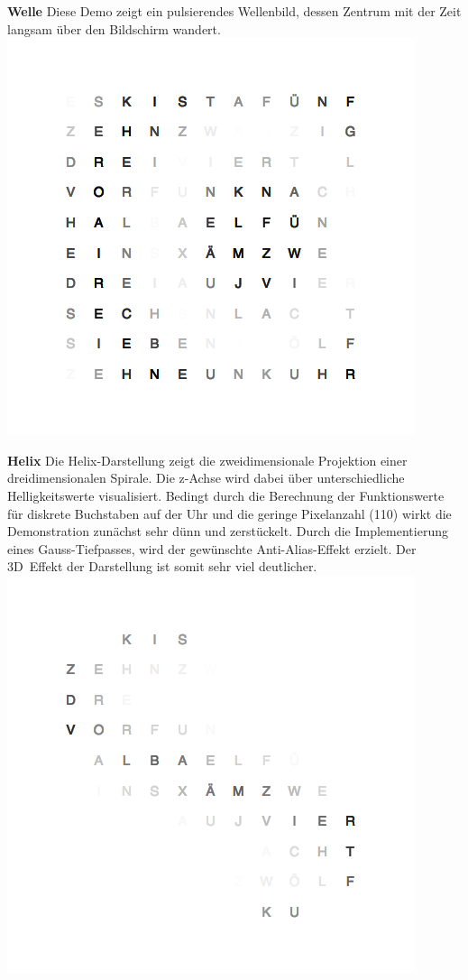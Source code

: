 \begin{multicols}{2}
\textbf{Welle}
Diese Demo zeigt ein pulsierendes Wellenbild, dessen Zentrum mit der Zeit langsam über den Bildschirm wandert.
\includegraphics[width=\columnwidth]{Abbildungen/Software/Demo/Welle}

\textbf{Helix}
Die Helix-Darstellung zeigt die zweidimensionale Projektion einer dreidimensionalen Spirale. Die z-Achse wird dabei über unterschiedliche Helligkeitswerte visualisiert. Bedingt durch die Berechnung der Funktionswerte für diskrete Buchstaben auf der Uhr und die geringe Pixelanzahl (110) wirkt die Demonstration zunächst sehr dünn und zerstückelt. Durch die Implementierung eines Gauss-Tiefpasses, wird der gewünschte Anti-Alias-Effekt erzielt. Der 3D~Effekt der Darstellung ist somit sehr viel deutlicher.
\includegraphics[width=\columnwidth]{Abbildungen/Software/Demo/Helix}


\end{multicols}
